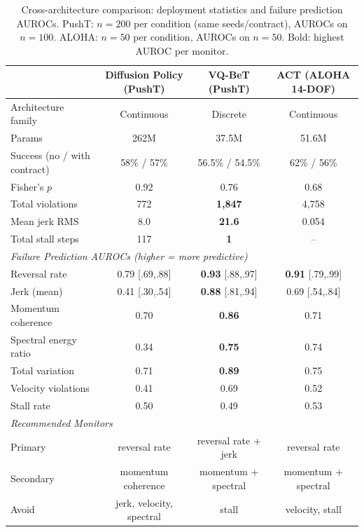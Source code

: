 \documentclass[conference]{IEEEtran}
\begin{document}
\begin{table}[t]
\centering
\caption{Cross-architecture comparison: deployment statistics and failure prediction AUROCs. PushT: $n{=}200$ per condition (same seeds/contract), AUROCs on $n{=}100$. ALOHA: $n{=}50$ per condition, AUROCs on $n{=}50$. Bold: highest AUROC per monitor.}
\label{tab:crossarch}
\small
\begin{tabular}{lccc}
\toprule
 & \textbf{Diffusion Policy (PushT)} & \textbf{VQ-BeT (PushT)} & \textbf{ACT (ALOHA 14-DOF)} \\
\midrule
Architecture family & Continuous & Discrete & Continuous \\
Params & 262M & 37.5M & 51.6M \\
Success (no / with contract) & 58\% / 57\% & 56.5\% / 54.5\% & 62\% / 56\% \\
Fisher's $p$ & 0.92 & 0.76 & 0.68 \\
Total violations & 772 & \textbf{1{,}847} & 4{,}758 \\
Mean jerk RMS & 8.0 & \textbf{21.6} & 0.054 \\
Total stall steps & 117 & \textbf{1} & -- \\
\midrule
\multicolumn{4}{l}{\textit{Failure Prediction AUROCs (higher = more predictive)}} \\
\midrule
Reversal rate & 0.79 {\scriptsize[.69,.88]} & \textbf{0.93} {\scriptsize[.88,.97]} & \textbf{0.91} {\scriptsize[.79,.99]} \\
Jerk (mean) & 0.41 {\scriptsize[.30,.54]} & \textbf{0.88} {\scriptsize[.81,.94]} & 0.69 {\scriptsize[.54,.84]} \\
Momentum coherence & 0.70 & \textbf{0.86} & 0.71 \\
Spectral energy ratio & 0.34 & \textbf{0.75} & 0.74 \\
Total variation & 0.71 & \textbf{0.89} & 0.75 \\
Velocity violations & 0.41 & 0.69 & 0.52 \\
Stall rate & 0.50 & 0.49 & 0.53 \\
\midrule
\multicolumn{4}{l}{\textit{Recommended Monitors}} \\
\midrule
Primary & reversal rate & reversal rate + jerk & reversal rate \\
Secondary & momentum coherence & momentum + spectral & momentum + spectral \\
Avoid & jerk, velocity, spectral & stall & velocity, stall \\
\bottomrule
\end{tabular}
\end{table}
\end{document}
